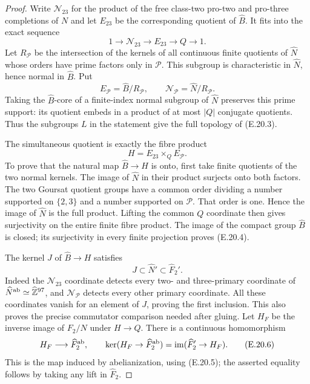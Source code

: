 \begin{proof}
Write $\mathcal N_{23}$ for the product of the free
class-two pro-two and pro-three completions of $N$ and
let $E_{23}$ be the corresponding quotient of $\widehat B$.
It fits into the exact sequence
\[
 1\longrightarrow\mathcal N_{23}\longrightarrow E_{23}
       \longrightarrow Q\longrightarrow1.
\]
Let $R_{\mathscr P}$ be the intersection of the kernels
of all continuous finite quotients of $\widehat N$
whose orders have prime factors only in $\mathscr P$.
This subgroup is characteristic in $\widehat N$, hence
normal in $\widehat B$. Put
\[
 E_{\mathscr P}=\widehat B/R_{\mathscr P},\qquad
 \mathcal N_{\mathscr P}=\widehat N/R_{\mathscr P}.
 \tag{E.20.3}
\]
Taking the $\widehat B$-core of a finite-index normal
subgroup of $\widehat N$ preserves this prime support:
its quotient embeds in a product of at most $|Q|$
conjugate quotients. Thus the subgroups $L$ in the
statement give the full topology of (E.20.3).

The simultaneous quotient is exactly the fibre product
\[
 H=E_{23}\mathbin{\times_Q}E_{\mathscr P}.
 \tag{E.20.4}
\]
To prove that the natural map $\widehat B\to H$ is
onto, first take finite quotients of the two normal
kernels. The image of $\widehat N$ in their product
surjects onto both factors. The two Goursat quotient
groups have a common order dividing a number supported
on $\{2,3\}$ and a number supported on $\mathscr P$.
That order is one. Hence the image of $\widehat N$
is the full product. Lifting the common $Q$ coordinate
then gives surjectivity on the entire finite fibre
product. The image of the compact group $\widehat B$
is closed; its surjectivity in every finite projection
proves (E.20.4).

The kernel $J$ of $\widehat B\to H$ satisfies
\[
                     J\subset\widehat N'\subset\widehat F_2'.
 \tag{E.20.5}
\]
Indeed the $\mathcal N_{23}$ coordinate detects every
two- and three-primary coordinate of
$\widehat N^{\rm ab}\simeq\widehat{\mathbb Z}^{97}$, and
$\mathcal N_{\mathscr P}$ detects every other primary
coordinate. All these coordinates vanish for an element
of $J$, proving the first inclusion. This also proves
the precise commutator comparison needed after gluing.
Let $H_F$ be the inverse image of $F_2/N$ under
$H\to Q$. There is a continuous homomorphism
\[
 H_F\longrightarrow\widehat F_2^{\rm ab},
 \qquad
 \ker(H_F\to\widehat F_2^{\rm ab})
       =\operatorname{im}(\widehat F_2'\to H_F).
 \tag{E.20.6}
\]
This is the map induced by abelianization, using
(E.20.5); the asserted equality follows by taking any
lift in $\widehat F_2$.


\end{proof}
